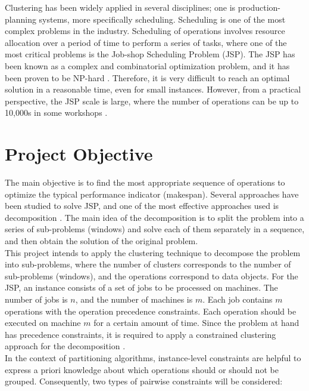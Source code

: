 \documentclass{article}
\begin{document}
Clustering has been widely applied in several disciplines; one is production-planning systems, more specifically scheduling. Scheduling is one of the most complex problems in the industry. Scheduling of operations involves resource allocation over a period of time to perform a series of tasks, where one of the most critical problems is the Job-shop Scheduling Problem (JSP). The JSP has been known as a complex and combinatorial optimization problem, and it has been proven to be NP-hard \cite{baker1974introduction,lenstra1979computational}. Therefore, it is very difficult to reach an optimal solution in a reasonable time, even for small instances. However, from a practical perspective, the JSP scale is large, where the number of operations can be up to 10,000s in some workshops \cite{zhang2010hybrid}. %

\section{Project Objective}
The main objective is to find the most appropriate sequence of operations to optimize the typical performance indicator (makespan). Several approaches have been studied to solve JSP, and one of the most effective approaches used is decomposition \cite{zhang2010hybrid,zhai2014decomposition}. The main idea of the decomposition is to split the problem into a series of sub-problems (windows) and solve each of them separately in a sequence, and then obtain the solution of the original problem. \\

This project intends to apply the clustering technique to decompose the problem into sub-problems, where the number of clusters corresponds to the number of sub-problems (windows), and the operations correspond to data objects. For the JSP, an instance consists of a set of jobs to be processed on machines. The number of jobs is $n$, and the number of machines is $m$. Each job contains $m$ operations with the operation precedence constraints. Each operation should be executed on machine $m$ for a certain amount of time. Since the problem at hand has precedence constraints, it is required to apply a constrained clustering approach for the decomposition \cite{wagstaff2001constrained}. \\

In the context of partitioning algorithms, instance-level constraints are helpful to express a priori knowledge about which operations should or should not be grouped. Consequently, two types of pairwise constraints will be considered:
\end{document}

